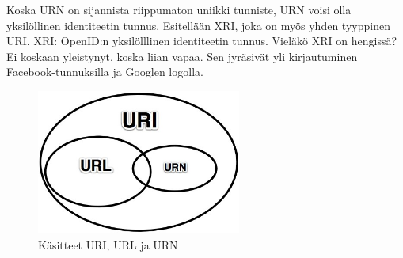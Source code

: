 \documentclass[finnish,gradu]{tktltiki}
\begin{document}
  Koska URN on sijannista riippumaton uniikki tunniste, URN voisi olla yksilöllinen identiteetin tunnus. Esitellään XRI, joka on myös yhden tyyppinen URI. XRI: OpenID:n yksilölllinen identiteetin tunnus. Vieläkö XRI on hengissä? Ei koskaan yleistynyt, koska liian vapaa. Sen jyräsivät yli kirjautuminen Facebook-tunnuksilla ja Googlen logolla.

  \begin{figure}
    \centering
    \includegraphics[width=0.6\textwidth]{images/uri_url_urn.jpg}
    \caption{Käsitteet URI, URL ja URN}
    \label{fig:uri_url_urn}
  \end{figure}





\end{document}
